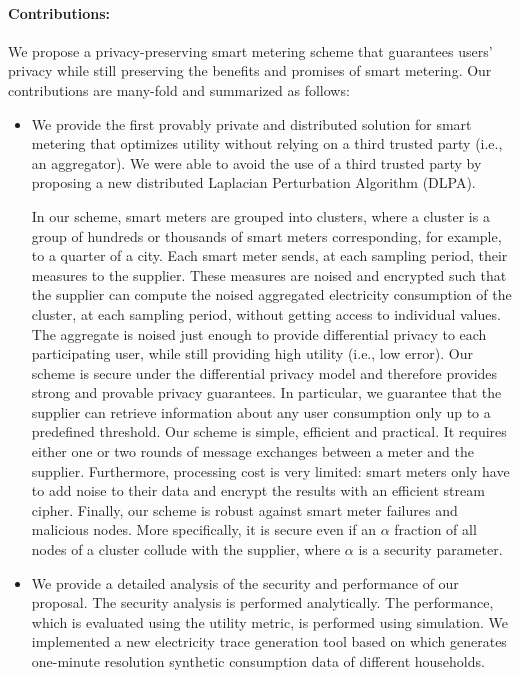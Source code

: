 \documentclass[11pt,a4paper]{article}
\theoremstyle{plain}
\theoremstyle{plain}
\theoremstyle{plain}
\theoremstyle{plain}
\theoremstyle{nonumberplain} \theoremseparator{}
\begin{document}
\paragraph{Contributions:}
We propose a privacy-preserving smart metering scheme that guarantees users' privacy 
while still preserving the benefits and promises of smart metering.
Our contributions are many-fold and summarized as follows:
\begin{itemize}
\item We provide the first provably private and distributed solution for smart metering that
optimizes utility without relying on a third trusted party (i.e., an 
aggregator). 
We were able to avoid the use of a third trusted party by proposing a new distributed 
Laplacian Perturbation Algorithm (DLPA). 

In our scheme, smart meters are grouped into clusters, where a cluster is a group of hundreds 
or thousands of smart meters corresponding, for example,  to a quarter of a city. Each smart meter sends, at each sampling
period, their measures to the supplier. 
These measures are noised and encrypted such that the supplier can compute
the noised aggregated electricity consumption of the cluster, at each sampling period, without getting access to 
individual values.  The aggregate is noised just enough to provide differential privacy to each participating user,  
while still providing high utility (i.e., low error).
Our scheme is secure under the differential privacy model
and therefore provides strong and provable privacy guarantees. 
In particular, we guarantee that the supplier can retrieve information about any user consumption only up to a predefined threshold. Our scheme is simple, efficient and practical. It requires either one or two rounds of message exchanges
between a meter and the supplier. Furthermore, processing cost is very limited:  smart meters only have 
to add noise to their data and encrypt the results with an efficient stream cipher. Finally, our scheme is robust against
smart meter failures and malicious nodes. More specifically, it is secure even if an $\alpha$ fraction of all nodes 
of a cluster collude with the supplier, where $\alpha$ is a security parameter.

\item We provide a detailed analysis of the security and performance of our proposal.
The security analysis is performed analytically. The performance, which is evaluated using
the utility metric, is performed using simulation. We implemented
a new electricity trace generation tool based on \cite{richardson10} which generates one-minute resolution synthetic consumption data of different households. 

\end{itemize}
\end{document}
